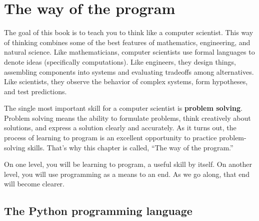 

\chapter{The way of the program}

The goal of this book is to teach you to think like a
computer scientist. This way of thinking combines some of the best features
of mathematics, engineering, and natural science.  Like mathematicians,
computer scientists use formal languages to denote ideas (specifically
computations).  Like engineers, they design things, assembling components
into systems and evaluating tradeoffs among alternatives.  Like scientists,
they observe the behavior of complex systems, form hypotheses, and test
predictions.

The single most important skill for a computer scientist is {\bf
problem solving}.  Problem solving means the ability to formulate
problems, think creatively about solutions, and express a solution clearly
and accurately.  As it turns out, the process of learning to program is an
excellent opportunity to practice problem-solving skills.  That's why
this chapter is called, ``The way of the program.''

On one level, you will be learning to program, a useful
skill by itself.  On another level, you will use programming as a means to
an end.  As we go along, that end will become clearer.

\section{The Python programming language}

